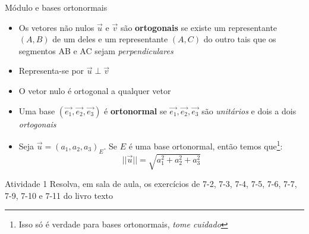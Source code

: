\begin{frame}{Módulo e bases ortonormais}
    \begin{itemize}
        \item Os vetores não nulos \(\vec{u}\) e \(\vec{v}\) são \textbf{ortogonais} se existe um representante
            \((A,B)\) de um deles e um representante \((A,C)\) do outro tais que os segmentos AB e AC sejam
            \textit{perpendiculares}
        \item Representa-se por \(\vec{u} \perp \vec{v}\)
        \item O vetor nulo é ortogonal a qualquer vetor
        \item Uma base \((\vec{e_1},\vec{e_2},\vec{e_3})\) é \textbf{ortonormal} se \(\vec{e_1},\vec{e_2},\vec{e_3}\)
            são \textit{unitários} e dois a dois \textit{ortogonais}
        \item Seja \(\vec{u}=(a_1,a_2,a_3)_E\). Se \(E\) é uma base ortonormal, então temos
            que\footnote{Isso só é verdade para bases ortonormais, \textit{tome cuidado}}:
            \[
                ||\vec{u}||=\sqrt{a_1^2+a_2^2+a_3^2}
            \]

    \end{itemize}
\end{frame}

\begin{frame}{Atividade 1}
    Resolva, em sala de aula, os exercícios de 7-2, 7-3, 7-4, 7-5, 7-6, 7-7, 7-9, 7-10 e 7-11 do livro texto
\end{frame}
